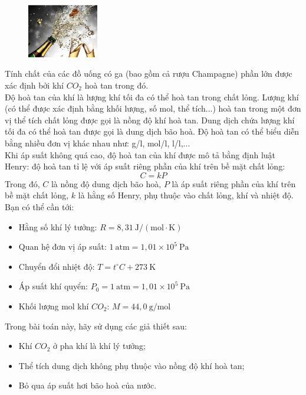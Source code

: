 \begin{figure}
  \centering
  \vspace{-0.55cm}
  \includegraphics[width=0.275\textwidth]{Figures/Problems/Fig 3.1.png}
\end{figure}

\noindent Tính chất của các đồ uống có ga (bao gồm cả rượu Champagne) phần lớn được xác định bởi khí $CO_2$ hoà tan trong đó.\\
\indent Độ hoà tan của khí là lượng khí tối đa có thể hoà tan trong chất lỏng. Lượng khí (có thể được xác định bằng khối lượng, số mol, thể tích...) hoà tan trong một đơn vị thể tích chất lỏng được gọi là nồng độ khí hoà tan. Dung dịch chứa lượng khí tối đa có thể hoà tan được gọi là dung dịch bão hoà. Độ hoà tan có thể biểu diễn bằng nhiều đơn vị khác nhau như: g/l, mol/l, l/l,...\\
\indent Khi áp suất không quá cao, độ hoà tan của khí được mô tả bằng định luật Henry: độ hoà tan tỉ lệ với áp suất riêng phần của khí trên bề mặt chất lỏng:
\begin{equation*}
  C = kP
\end{equation*}
Trong đó, $C$ là nồng độ dung dịch bão hoà, $P$ là áp suất riêng phần của khí trên bề mặt chất lỏng, $k$ là hằng số Henry, phụ thuộc vào chất lỏng, khí và nhiệt độ.\\
\indent Bạn có thể cần tới:
\begin{itemize}
  \item Hằng số khí lý tưởng: $R = 8{,}31~\text{J}/(\text{mol}\cdot\text{K})$
  \item Quan hệ đơn vị áp suất: $1~\text{atm} = 1{,}01 \times 10^5~\text{Pa}$
  \item Chuyển đổi nhiệt độ: $T = t^\circ C + 273~\text{K}$
  \item Áp suất khí quyển: $P_0 = 1~\text{atm} = 1{,}01 \times 10^5~\text{Pa}$
  \item Khối lượng mol khí $CO_2$: $M = 44{,}0~\text{g/mol}$
\end{itemize}
Trong bài toán này, hãy sử dụng các giả thiết sau:
\begin{itemize}
  \item Khí $CO_2$ ở pha khí là khí lý tưởng;
  \item Thể tích dung dịch không phụ thuộc vào nồng độ khí hoà tan;
  \item Bỏ qua áp suất hơi bão hoà của nước.
\end{itemize}

